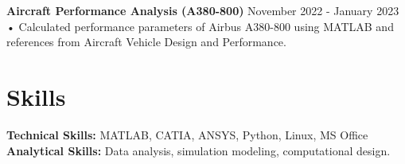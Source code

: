 \documentclass[a4paper,10pt]{article}
\begin{document}
\noindent
\textbf{Aircraft Performance Analysis (A380-800)} \hfill November 2022 - January 2023 \\
• Calculated performance parameters of Airbus A380-800 using MATLAB and references from Aircraft Vehicle Design and Performance.

\section*{Skills}

\noindent
\textbf{Technical Skills:} MATLAB, CATIA, ANSYS, Python, Linux, MS Office \\
\textbf{Analytical Skills:} Data analysis, simulation modeling, computational design.
\end{document}
